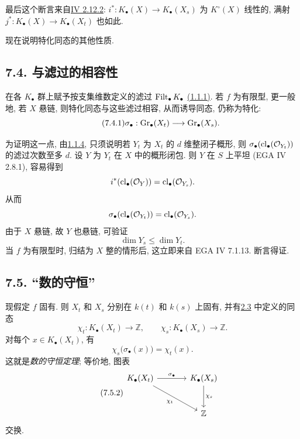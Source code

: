 最后这个断言来自\hyperlink{sga6.e04.eq.2-12-2}{IV 2.12.2}: $i^*:K_\bullet(X)\to K_\bullet(X_s)$ 为 $K^\circ(X)$ 线性的, 满射 $j^*:K_\bullet(X)\to K_\bullet(X_t)$ 也如此.
%
%

现在说明特化同态的其他性质.

\subsection*{7.4. 与滤过的相容性} 在各 $K_\bullet$ 群上赋予按支集维数定义的滤过 $\operatorname{Filt}_\bullet K_\bullet$ \hyperlink{sga6.e10.def.1-1-1}{(1.1.1)}. 若 $f$ 为有限型, 更一般地, 若 $X$ 悬链, 则特化同态与这些滤过相容, 从而诱导同态, 仍称为特化:
%
%
%
%
%
\begin{equation}\tag{7.4.1}
\sigma_\bullet:\operatorname{Gr}_\bullet(X_t)\longrightarrow\operatorname{Gr}_\bullet(X_s).
\end{equation}

为证明这一点, 由\hyperlink{sga6.e10.cor.1-1-4}{1.1.4}, 只须说明若 $Y_t$ 为 $X_t$ 的 $d$ 维整闭子概形, 则 $\sigma_\bullet(\operatorname{cl}_\bullet(\mathcal O_{Y_t}))$ 的滤过次数至多 $d$. 设 $Y$ 为 $Y_t$ 在 $X$ 中的概形闭包. 则 $Y$ 在 $S$ 上平坦 (EGA IV 2.8.1), 容易得到
%
%
%
%
\[
i^*(\operatorname{cl}_\bullet(\mathcal O_Y))
=\operatorname{cl}_\bullet(\mathcal O_{Y_s}).
\]
从而
\[
\sigma_\bullet(\operatorname{cl}_\bullet(\mathcal O_{Y_t}))
=\operatorname{cl}_\bullet(\mathcal O_{Y_s}).
\]
由于 $X$ 悬链, 故 $Y$ 也悬链, 可验证
\[
\dim Y_s\leq\dim Y_t.
\]
当 $f$ 为有限型时, 归结为 $X$ 整的情形后, 这立即来自 EGA IV 7.1.13. 断言得证.
%

\subsection*{7.5. “数的守恒”} 现假定 $f$ 固有. 则 $X_t$ 和 $X_s$ 分别在 $k(t)$ 和 $k(s)$ 上固有, 并有\hyperlink{sga6.e10.sec.2.3}{2.3} 中定义的同态
%
%
%
\[
\chi_t:K_\bullet(X_t)\longrightarrow\mathbb Z,
\qquad
\chi_s:K_\bullet(X_s)\longrightarrow\mathbb Z.
\]
对每个 $x\in K_\bullet(X_t)$, 有
\begin{equation}\tag{7.5.1}
\chi_s\bigl(\sigma_\bullet(x)\bigr)=\chi_t(x).
\end{equation}
这就是\emph{数的守恒定理}; 等价地, 图表
\begin{equation}\tag{7.5.2}
\begin{tikzcd}[column sep=large,row sep=large]
K_\bullet(X_t) \arrow[r,"\sigma_\bullet"] \arrow[dr,"\chi_t"'] &
K_\bullet(X_s) \arrow[d,"\chi_s"]\\
& \mathbb Z
\end{tikzcd}
\end{equation}
交换.

